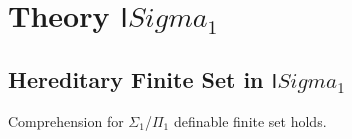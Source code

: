 \chapter{Theory $\mathsf{I}Sigma_1$}

\section{Hereditary Finite Set in $\mathsf{I}Sigma_1$}

\begin{theorem}[]\label{LO.FirstOrder.Arith.Model.finite_comprehension₁!}
  \leanok
  Comprehension for $\Sigma_1$/$\Pi_1$ definable finite set holds.
\end{theorem}